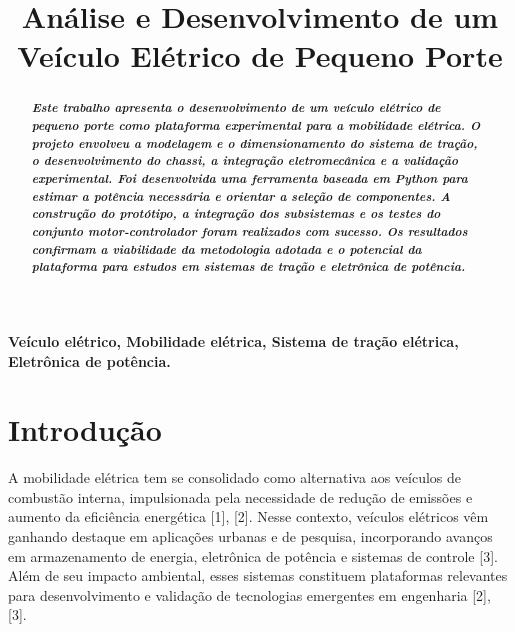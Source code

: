 \documentclass[conference]{IEEEtran}
\begin{document}
\title{Análise e Desenvolvimento de um Veículo Elétrico de Pequeno Porte}

\author{
}

\maketitle



\let\SEPOCabstractname\abstractname
\renewcommand{\abstractname}{\textbf{\textit{\SEPOCabstractname}}}
\begin{abstract}
\bfseries\itshape
Este trabalho apresenta o desenvolvimento de um veículo elétrico de pequeno porte como plataforma experimental para a mobilidade elétrica. O projeto envolveu a modelagem e o dimensionamento do sistema de tração, o desenvolvimento do chassi, a integração eletromecânica e a validação experimental. Foi desenvolvida uma ferramenta baseada em Python para estimar a potência necessária e orientar a seleção de componentes. A construção do protótipo, a integração dos subsistemas e os testes do conjunto motor-controlador foram realizados com sucesso. Os resultados confirmam a viabilidade da metodologia adotada e o potencial da plataforma para estudos em sistemas de tração e eletrônica de potência.
\end{abstract}

\renewcommand{\IEEEkeywordsname}{\textbf{\textit{Palavras-chave}}}
\begin{IEEEkeywords}
\bfseries
Veículo elétrico, Mobilidade elétrica, Sistema de tração elétrica, Eletrônica de potência.
\end{IEEEkeywords}




\section{Introdução}

A mobilidade elétrica tem se consolidado como alternativa aos veículos de combustão interna, impulsionada pela necessidade de redução de emissões e aumento da eficiência energética [1], [2]. Nesse contexto, veículos elétricos vêm ganhando destaque em aplicações urbanas e de pesquisa, incorporando avanços em armazenamento de energia, eletrônica de potência e sistemas de controle [3]. Além de seu impacto ambiental, esses sistemas constituem plataformas relevantes para desenvolvimento e validação de tecnologias emergentes em engenharia [2], [3].
\end{document}

